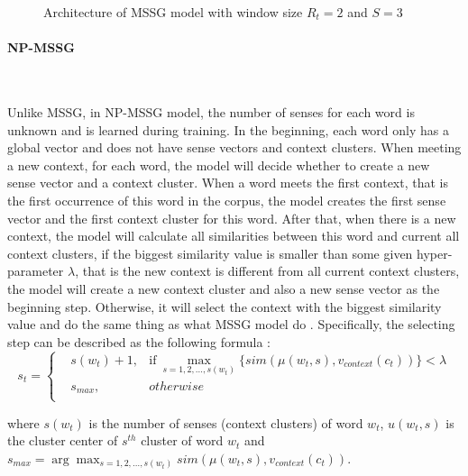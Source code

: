 \begin{figure}[!ht]
  \centering
	\caption{Architecture of MSSG model with window size $R_t=2$ and $S=3$ }
	\label{fig:MSSG}
\end{figure} 

\paragraph{NP-MSSG}\ 

Unlike MSSG, in NP-MSSG model, the number of senses for each word is unknown and is learned during training. In the beginning, each word only has a global vector and does not have sense vectors and context clusters. When meeting a new context, for each word, the model will decide whether to create a new sense vector and a context cluster. When a word meets the first context, that is the first occurrence of this word in the corpus, the model creates the first sense vector and the first context cluster for this word.  After that, when there is a new context, the model will calculate all similarities between this word and current all context clusters, if the biggest similarity value is smaller than some given hyper-parameter $\lambda$, that is the new context is different from all current context clusters, the model will create a new context cluster and also a new sense vector as the beginning step. Otherwise, it will select the context with the biggest similarity value and do the same thing as what MSSG model do . Specifically, the selecting step can be described as the following formula :
$$s_t=\left\{
\begin{aligned}
&s(w_t)+1, &\mathrm{if}\  \max_{s=1,2,\ldots,s(w_t)}\{sim(\mu(w_t,s),v_{context}(c_t))\}<\lambda \\
&s_{max}, & otherwise \\
\end{aligned}
\right.
$$

where $s(w_t)$ is the number of senses (context clusters) of word $w_t$, $u(w_t,s)$ is the cluster center of $s^{th}$ cluster of word $w_t$ and $s_{max}=\arg\max_{s=1,2,…,s(w_t)}sim(\mu(w_t,s),v_{context}(c_t))$. 

